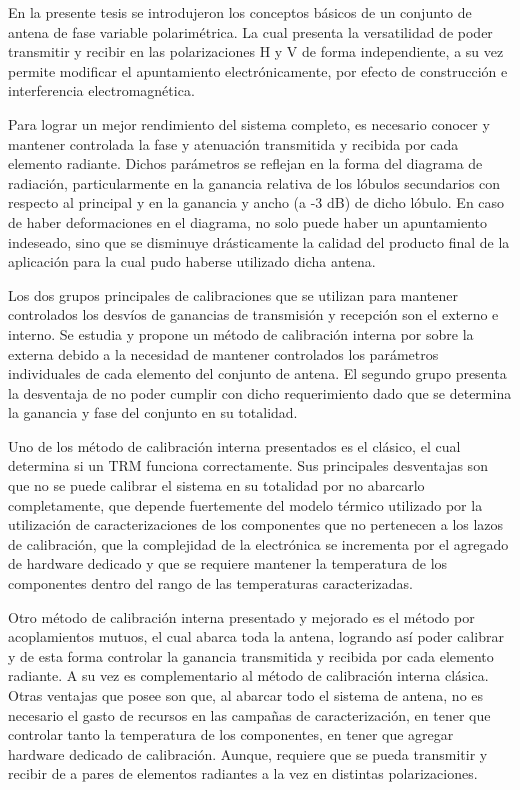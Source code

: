 En la presente tesis se introdujeron los conceptos básicos de un conjunto de antena de fase variable polarimétrica. La cual 
presenta la versatilidad de poder transmitir y recibir en las polarizaciones H y V de forma independiente, a su vez permite
modificar el apuntamiento electrónicamente, por efecto de construcción e interferencia electromagnética.

Para lograr un mejor rendimiento del sistema completo, es necesario conocer y mantener controlada la fase y atenuación
transmitida y recibida por cada elemento radiante. Dichos parámetros se reflejan en la forma del diagrama de radiación,
particularmente en la ganancia relativa de los lóbulos secundarios con respecto al principal y en la ganancia y ancho (a -3 dB)
de dicho lóbulo. En caso de haber deformaciones en el diagrama, no solo puede haber un apuntamiento indeseado, sino que se
disminuye drásticamente la calidad del producto final de la aplicación para la cual pudo haberse utilizado dicha antena.

Los dos grupos principales de calibraciones que se utilizan para mantener controlados los desvíos de ganancias de transmisión y
recepción son el externo e interno. Se estudia y propone un método de calibración interna por sobre la externa debido a la
necesidad de mantener controlados los parámetros individuales de cada elemento del conjunto de antena. El segundo grupo presenta
la desventaja de no poder cumplir con dicho requerimiento dado que se determina la ganancia y fase del conjunto en su totalidad. 

Uno de los método de calibración interna presentados es el clásico, el cual determina si un TRM funciona correctamente. 
Sus principales desventajas son que no se puede calibrar el sistema en su totalidad por no abarcarlo completamente, que depende
fuertemente del modelo térmico utilizado por la utilización de caracterizaciones de los componentes que no pertenecen a
los lazos de calibración, que la complejidad de la electrónica se incrementa por el agregado de hardware dedicado y que se
requiere mantener la temperatura de los componentes dentro del rango de las temperaturas caracterizadas.

Otro método de calibración interna presentado y mejorado es el método por acoplamientos mutuos, el cual abarca toda la
antena, logrando así poder calibrar y de esta forma controlar la ganancia transmitida y recibida por cada elemento radiante. A su
vez es complementario al método de calibración interna clásica. Otras ventajas que posee son que, al abarcar todo el sistema de
antena, no es necesario el gasto de recursos en las campañas de caracterización, en tener que controlar tanto la temperatura de
los componentes, en tener que agregar hardware dedicado de calibración. Aunque, requiere que se pueda transmitir y recibir de a
pares de elementos radiantes a la vez en distintas polarizaciones. 

